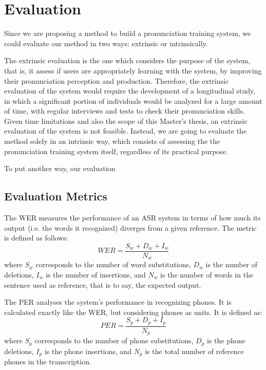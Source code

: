 \section{Evaluation}

Since we are proposing a method to build a pronunciation training system, we could
evaluate our method in two ways: extrinsic or intrinsically.

The extrinsic evaluation is the one which considers the purpose of the system, that is,
it assess if users are appropriately learning with the system, by improving their 
pronunciation perception and production. Therefore, the extrinsic evaluation of the
system would require the development of a longitudinal study, in which a significant 
portion of individuals would be analyzed for a large amount of time, with regular interviews
and tests to check their pronunciation skills. Given time limitations and also the scope
of this Master's thesis, an extrinsic evaluation of the system is not feasible. Instead, we 
are going to evaluate the method solely in an intrinsic way, which consists 
of assessing the the pronunciation training system itself, regardless of its practical purpose.

To put another way, our evaluation 

\subsection{Evaluation Metrics}

The \ac{WER} measures the performance of an \ac{ASR} system in terms of how
much its output (i.e. the words it recognized) diverges from a given reference. The metric
is defined as follows:
\begin{equation}
 \textit{WER}=\frac{S_w+D_w+I_w}{N_w}
\end{equation}
where $S_w$ corresponds to the number of word substitutions, $D_w$ is the number of deletions, 
$I_w$ is the number of insertions, and $N_w$ is the number of words in the sentence used
as reference, that is to say, the expected output.

The \ac{PER} analyses the system's performance in recognizing phones. It
is calculated exactly like the \ac{WER}, but considering phones as units. It is defined as:
\begin{equation}
 \textit{PER}=\frac{S_p+D_p+I_p}{N_p}
\end{equation}
where $S_p$ corresponds to the number of phone substitutions, $D_p$ is the phone deletions, 
$I_p$ is the phone insertions, and $N_p$ is the total number of reference phones in 
the transcription.

